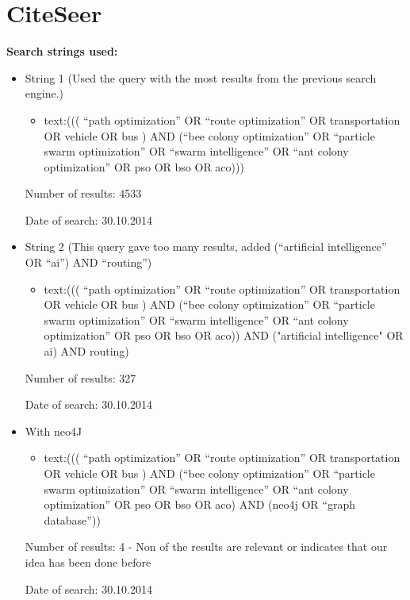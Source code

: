 \section{CiteSeer}
\textbf{Search strings used:}
\begin{itemize}
\item String 1 (Used the query with the most results from the previous search engine.)
\begin{itemize}
\item text:((( ``path optimization'' OR ``route optimization'' OR transportation OR vehicle OR bus ) AND (``bee colony optimization'' OR ``particle swarm optimization'' OR ``swarm intelligence'' OR ``ant colony optimization'' OR pso OR bso OR aco)))
\end{itemize}
\par
Number of results: 4533
\par
Date of search: 30.10.2014
\end{itemize}
\begin{itemize}
\item String 2 (This query gave too many results, added (``artificial intelligence'' OR ``ai'') AND ``routing'')
\begin{itemize}
\item text:((( ``path optimization'' OR ``route optimization'' OR transportation OR vehicle OR bus ) AND (``bee colony optimization'' OR ``particle swarm optimization'' OR ``swarm intelligence'' OR ``ant colony optimization'' OR pso OR bso OR aco)) AND ("artificial intelligence" OR ai) AND routing)
\end{itemize}
\par
Number of results: 327
\par
Date of search: 30.10.2014
\end{itemize}
\begin{itemize}
\item With neo4J
\begin{itemize}
\item text:((( ``path optimization'' OR ``route optimization'' OR transportation OR vehicle OR bus ) AND (``bee colony optimization'' OR ``particle swarm optimization'' OR ``swarm intelligence'' OR ``ant colony optimization'' OR pso OR bso OR aco) AND (neo4j OR ``graph database''))
\end{itemize}
\par
Number of results: 4 - Non of the results are relevant or indicates that our idea has been done before
\par
Date of search: 30.10.2014
\end{itemize}






